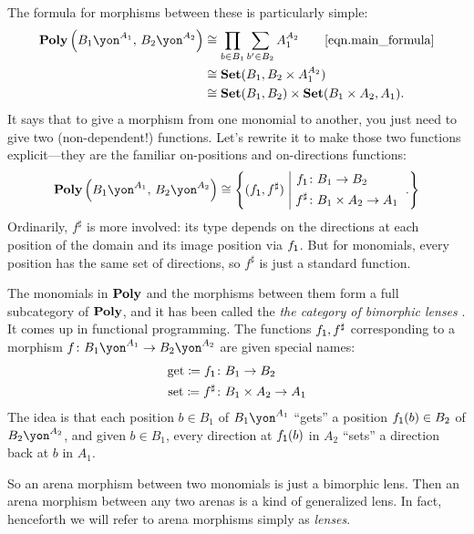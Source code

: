 \documentclass[Book-Poly]{subfiles}
\begin{document}
The formula for morphisms between these is particularly simple:
\begin{align*}
  \poly\left(B_1\yon^{A_1},\,B_2\yon^{A_2}\right) &\iso \prod_{b \in B_1} \sum_{b' \in B_2} A_1^{A_2} \tag*{\eqref{eqn.main_formula}} \\
  &\iso \smset(B_1, B_2 \times A_1^{A_2}) \\
  &\iso \smset(B_1,B_2)\times\smset(B_1\times A_2,A_1).
\end{align*}
It says that to give a morphism from one monomial to another, you just need to give two (non-dependent!) functions. Let's rewrite it to make those two functions explicit---they are the familiar on-positions and on-directions functions:
\[
  \poly\left(B_1\yon^{A_1},\,B_2\yon^{A_2}\right)
  \iso
  \left\{
    (f_\1,f^\sharp)
  \;\middle|\;
  	\parbox{1.2in}{
    $
    \begin{aligned}
  	  f_\1&\colon B_1\to B_2\\
  	  f^\sharp&\colon B_1\times A_2\to A_1
    \end{aligned}
    $
  }.
  \right\}
\]
Ordinarily, $f^\sharp$ is more involved: its type depends on the directions at each position of the domain and its image position via $f_{\textsf{1}}$.
But for monomials, every position has the same set of directions, so $f^\sharp$ is just a standard function.

The monomials in $\mathbf{Poly}$ and the morphisms between them form a full subcategory of $\mathbf{Poly}$, and it has been called the \emph{the category of bimorphic lenses} \cite{hedges2018limits}. It comes up in functional programming. The functions $f_{\textsf{1}}, f^\sharp$ corresponding to a morphism $f \colon B_1\yon^{A_1}\to B_2\yon^{A_2}$ are given special names:
\begin{equation}\label{eqn.bimorphic_lens}
\begin{aligned}
	\text{get} \coloneqq f_{\textsf{1}} &\colon B_1\to B_2\\
	\text{set} \coloneqq f^\sharp &\colon B_1\times A_2\to A_1
\end{aligned}
\end{equation}
The idea is that each position $b \in B_1$ of $B_1\yon^{A_1}$ ``gets'' a position $f_{\textsf{1}}(b) \in B_2$ of $B_2\yon^{A_2}$, and given $b \in B_1$, every direction at $f_{\textsf{1}}(b)$ in $A_2$ ``sets'' a direction back at $b$ in $A_1$.

So an arena morphism between two monomials is just a bimorphic lens.
Then an arena morphism between any two arenas is a kind of generalized lens.
In fact, henceforth we will refer to arena morphisms simply as \emph{lenses}.
\end{document}
